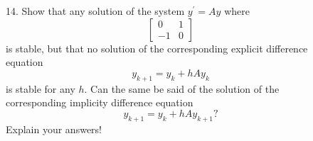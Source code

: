 \documentclass{article}
\begin{document}
\begin{description}
\item[\quad] 14.
Show that any solution of the system $y^\prime = Ay$ where
$$\left[\begin{array}{cc}
        0&1 \\
        -1& 0
        \end{array}
        \right]$$
is stable, but that no solution of the corresponding explicit difference
equation
$$y_{k+1} = y_k + hAy_k$$
is stable for any $h$. Can the same be said of the solution of the
corresponding implicity difference equation
$$y_{k+1} = y_k + hAy_{k+1}?$$
Explain your answers!



























\end{description}    
\end{document}
